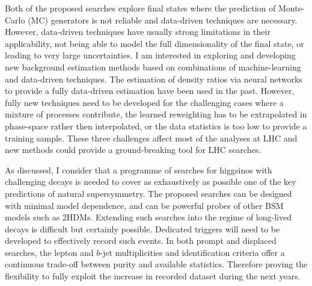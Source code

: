 \hspace{20pt}Both of the proposed searches explore final states where the prediction of Monte-Carlo (MC) generators is not reliable and data-driven techniques are necessary. However, data-driven techniques have usually strong limitations in their applicability, not being able to model the full dimensionality of the final state, or leading to very large uncertainties. I am interested in exploring and developing new background estimation methods based on combinations of machine-learning and data-driven techniques. The estimation of density ratios via neural networks to provide a fully data-driven estimation have been used in the past. However, fully new techniques need to be developed for the challenging cases where a mixture of processes contribute, the learned reweighting has to be extrapolated in phase-space rather then interpolated, or the data statistics is too low to provide a training sample. These three challenges affect most of the analyses at LHC and new methods could provide a ground-breaking tool for LHC searches. 



\hspace{20pt}As discussed, I consider that a programme of searches for higgsinos with challenging decays is needed to cover as exhaustively as possible one of the key predictions of natural supersymmetry. The proposed searches can be designed with minimal model dependence, and can be powerful probes of other BSM models such as 2HDMs. Extending such searches into the regime of long-lived decays is difficult but certainly possible. Dedicated triggers will need to be developed to effectively record such events. In both prompt and displaced searches, the lepton and $b$-jet multiplicities and identification criteria offer a continuous trade-off between purity and available statistics. Therefore proving the flexibility to fully exploit the increase in recorded dataset during the next years.